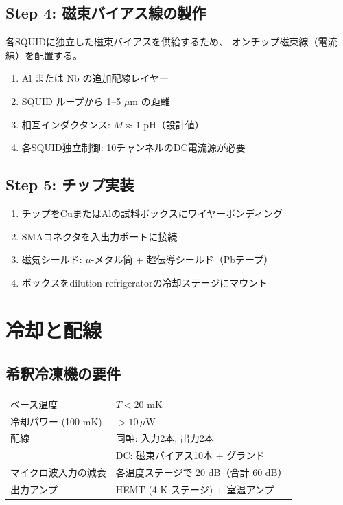 \documentclass[12pt,a4paper]{article}
\begin{document}
\subsection{Step 4: 磁束バイアス線の製作}

各SQUIDに独立した磁束バイアスを供給するため、
オンチップ磁束線（電流線）を配置する。

\begin{enumerate}
\item Al または Nb の追加配線レイヤー
\item SQUID ループから 1--5 $\mu$m の距離
\item 相互インダクタンス: $M \approx 1$ pH（設計値）
\item 各SQUID独立制御: 10チャンネルのDC電流源が必要
\end{enumerate}

\subsection{Step 5: チップ実装}

\begin{enumerate}
\item チップをCuまたはAlの試料ボックスにワイヤーボンディング
\item SMAコネクタを入出力ポートに接続
\item 磁気シールド: $\mu$-メタル筒 + 超伝導シールド（Pbテープ）
\item ボックスをdilution refrigeratorの冷却ステージにマウント
\end{enumerate}

\section{冷却と配線}

\subsection{希釈冷凍機の要件}

\begin{specbox}[冷凍機仕様]
\begin{tabular}{ll}
ベース温度 & $T < 20$ mK \\
冷却パワー (100 mK) & $> 10\,\mu$W \\
配線 & 同軸: 入力2本, 出力2本 \\
 & DC: 磁束バイアス10本 + グランド \\
マイクロ波入力の減衰 & 各温度ステージで 20 dB（合計 60 dB） \\
出力アンプ & HEMT (4 K ステージ) + 室温アンプ \\
\end{tabular}
\end{specbox}
\end{document}
